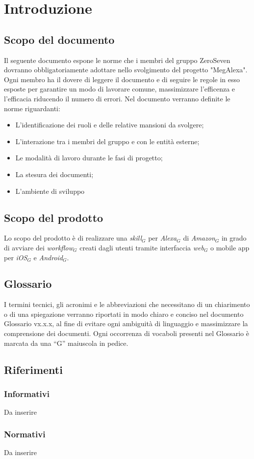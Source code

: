 \newpage
\section{Introduzione}
\subsection{Scopo del documento}
Il seguente documento espone le norme che i membri del gruppo ZeroSeven dovranno obbligatoriamente adottare nello svolgimento del progetto "MegAlexa".
Ogni membro ha il dovere di leggere il documento e di seguire le regole in esso esposte per garantire  un modo di lavorare comune, massimizzare l'efficenza e l'efficacia riducendo il numero di errori.
Nel documento verranno definite le  norme riguardanti:
\begin{itemize}
		\item L'identificazione dei ruoli e delle relative mansioni da svolgere;
		\item L'interazione tra i membri del gruppo e con le entità esterne;
		\item Le modalità di lavoro durante le fasi di progetto;
		\item La stesura dei documenti;
		\item L'ambiente di sviluppo
\end{itemize}

\subsection{Scopo del prodotto}
Lo scopo del prodotto è di realizzare una \textit{skill$_{G}$} per \textit{Alexa$_{G}$} di \textit{Amazon$_{G}$} in grado di avviare dei \textit{workflow$_{G}$} creati dagli utenti tramite interfaccia \textit{web$_{G}$} o mobile app per \textit{iOS$_{G}$} e \textit{Android$_{G}$}.

\subsection{Glossario}
I termini tecnici, gli acronimi e le abbreviazioni che necessitano di un chiarimento
o di una spiegazione verranno riportati in modo chiaro e conciso nel
documento Glossario vx.x.x, al fine di evitare ogni ambiguità di linguaggio
e massimizzare la comprensione dei documenti. Ogni occorrenza di vocaboli
presenti nel Glossario è marcata da una “G” maiuscola in pedice.
\subsection{Riferimenti}
\subsubsection{Informativi}
Da inserire
\subsubsection{Normativi}
Da inserire